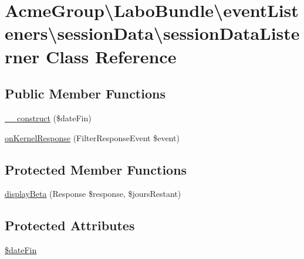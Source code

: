 \hypertarget{class_acme_group_1_1_labo_bundle_1_1event_listeners_1_1session_data_1_1session_data_listerner}{\section{Acme\+Group\textbackslash{}Labo\+Bundle\textbackslash{}event\+Listeners\textbackslash{}session\+Data\textbackslash{}session\+Data\+Listerner Class Reference}
\label{class_acme_group_1_1_labo_bundle_1_1event_listeners_1_1session_data_1_1session_data_listerner}
}
\subsection*{Public Member Functions}
\begin{DoxyCompactItemize}
\item 
\hyperlink{class_acme_group_1_1_labo_bundle_1_1event_listeners_1_1session_data_1_1session_data_listerner_aa0ba6329a67b9dd671d189eb01c9f68a}{\+\_\+\+\_\+construct} (\$date\+Fin)
\item 
\hyperlink{class_acme_group_1_1_labo_bundle_1_1event_listeners_1_1session_data_1_1session_data_listerner_aa3763f98ada85aa30e8b120c164bcaa1}{on\+Kernel\+Response} (Filter\+Response\+Event \$event)
\end{DoxyCompactItemize}
\subsection*{Protected Member Functions}
\begin{DoxyCompactItemize}
\item 
\hyperlink{class_acme_group_1_1_labo_bundle_1_1event_listeners_1_1session_data_1_1session_data_listerner_ac76f76b851f61d9f51c8a8823f2683f8}{display\+Beta} (Response \$response, \$jours\+Restant)
\end{DoxyCompactItemize}
\subsection*{Protected Attributes}
\begin{DoxyCompactItemize}
\item 
\hyperlink{class_acme_group_1_1_labo_bundle_1_1event_listeners_1_1session_data_1_1session_data_listerner_ac2b265b48a01295ef21193682378173e}{\$date\+Fin}
\end{DoxyCompactItemize}


